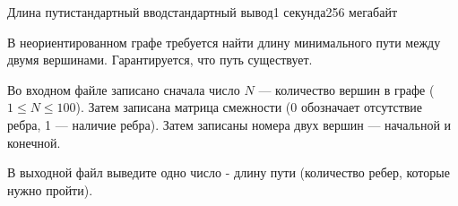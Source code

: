 \begin{problem}{Длина пути}{стандартный ввод}{стандартный вывод}{1 секунда}{256 мегабайт}

В неориентированном графе требуется найти длину минимального пути между двумя вершинами. Гарантируется, что путь существует.

\InputFile
Во входном файле записано сначала число $N$ --- количество вершин в графе ($1 \le N \le 100$). Затем записана матрица смежности (0 обозначает отсутствие ребра, 1 --- наличие ребра). Затем записаны номера двух вершин --- начальной и конечной.

\OutputFile
В выходной файл выведите одно число - длину пути (количество ребер, которые нужно пройти).

\Example

\begin{example}
%
\end{example}

\end{problem}

